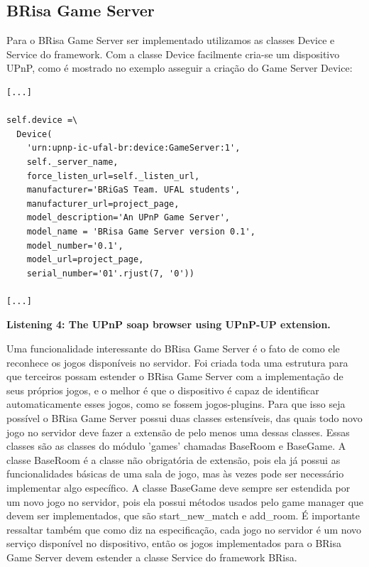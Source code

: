 \documentclass[a4paper]{sbgames}               %
\begin{document}
\subsection{ BRisa Game Server}
Para o BRisa Game Server ser implementado utilizamos as classes Device e Service do framework. Com a classe Device facilmente cria-se um dispositivo UPnP, como é mostrado no exemplo asseguir a criação do Game Server Device:



\begin{lstlisting}[name=soap_browser_new]
[...]

self.device =\
  Device(
    'urn:upnp-ic-ufal-br:device:GameServer:1',
    self._server_name,
    force_listen_url=self._listen_url,
    manufacturer='BRiGaS Team. UFAL students',
    manufacturer_url=project_page,
    model_description='An UPnP Game Server',
    model_name = 'BRisa Game Server version 0.1',
    model_number='0.1',
    model_url=project_page,
    serial_number='01'.rjust(7, '0'))

[...]
\end{lstlisting}
\vspace{-2mm}
\scriptsize
\textbf{Listening 4: The UPnP soap browser using UPnP-UP extension.}
\vspace{3mm}
\normalsize

Uma funcionalidade interessante do BRisa Game Server é o fato de como ele reconhece os jogos disponíveis no servidor. Foi criada toda uma estrutura para que terceiros possam estender o BRisa Game Server com a implementação de seus próprios jogos, e o melhor é que o dispositivo é capaz de identificar automaticamente esses jogos, como se fossem jogos-plugins. Para que isso seja possível o BRisa Game Server possui duas classes estensíveis, das quais todo novo jogo no servidor deve fazer a extensão de pelo menos uma dessas classes. Essas classes são as classes do módulo 'games' chamadas BaseRoom e BaseGame. A classe BaseRoom é a classe não obrigatória de extensão, pois ela já possui as funcionalidades básicas de uma sala de jogo, mas às vezes pode ser necessário implementar algo específico.
A classe BaseGame deve sempre ser estendida por um novo jogo no servidor, pois ela possui métodos usados pelo game manager que devem ser implementados, que são start\_new\_match e add\_room. É importante ressaltar também que como diz na especificação, cada jogo no servidor é um novo serviço disponível no dispositivo, então os jogos implementados para o BRisa Game Server devem estender a classe Service do framework BRisa.
\end{document}
